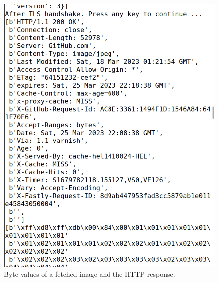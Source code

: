 \begin{figure}
    \centering
    \includegraphics[height=\textheight,width=\textwidth,keepaspectratio]
    {figures/http_req_image_fetching.png}
    \caption{Byte values of a fetched image and the HTTP response.}
    \label{fig:byte_fetch_image}
\end{figure}